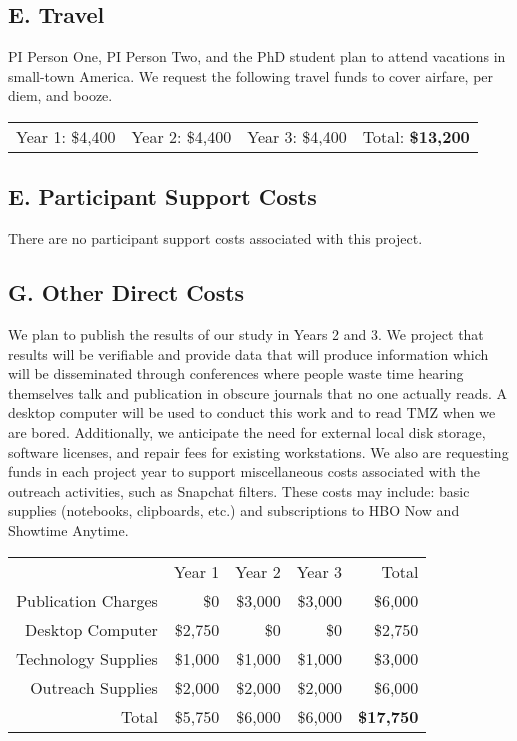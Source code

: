 \documentclass[nsfbudgjust]{nsfproposal}
\begin{document}
\subsection*{E. Travel}
PI Person One, PI Person Two, and the PhD student plan to attend vacations in small-town America. We request the following travel funds to cover airfare, per diem, and booze.
\newline
\begin{table}[H]
\begin{tabular}[c]{cccc}
Year 1: \$4,400  & Year 2: \$4,400    & Year 3: \$4,400    & Total: \textbf{\$13,200}
\end{tabular}
\end{table}

\subsection*{E. Participant Support Costs}
There are no participant support costs associated with this project.

\subsection*{G. Other Direct Costs}
We plan to publish the results of our study in Years 2 and 3. We project that results will be verifiable and provide data that will produce information which will be disseminated through conferences where people waste time hearing themselves talk and publication in obscure journals that no one actually reads. A desktop computer will be used to conduct this work and to read TMZ when we are bored. Additionally, we anticipate the need for external local disk storage, software licenses, and repair fees for existing workstations. We also are requesting funds in each project year to support miscellaneous costs associated with the outreach activities, such as Snapchat filters.  These costs may include: basic supplies (notebooks, clipboards, etc.) and subscriptions to HBO Now and Showtime Anytime.
\newline
\begin{table}[H]
\begin{tabular}[c]{r r r r | r}
 & Year 1 & Year 2 & Year 3 & Total\\
Publication Charges     & \$0        & \$3,000    & \$3,000    & \$6,000\\
Desktop Computer        & \$2,750    & \$0        & \$0        & \$2,750\\
Technology Supplies     & \$1,000    & \$1,000    &\$1,000     & \$3,000\\
Outreach Supplies       & \$2,000    & \$2,000    &\$2,000     & \$6,000\\
\hline
Total                   & \$5,750   & \$6,000   & \$6,000 & \textbf{\$17,750}
\end{tabular}
\end{table}
\end{document}
